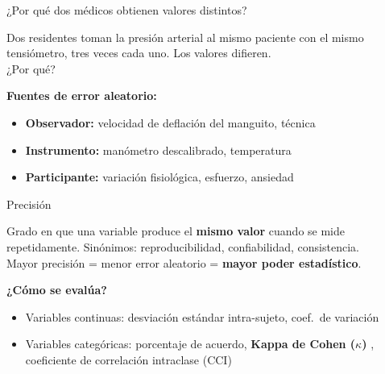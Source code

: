 \documentclass[aspectratio=169, 12pt, xcolor=table]{beamer}
\begin{document}
\begin{frame}{¿Por qué dos médicos obtienen valores distintos?}
  \begin{caso}
    Dos residentes toman la presión arterial al mismo paciente con el
    mismo tensiómetro, tres veces cada uno. Los valores difieren.\\[4pt]
    ¿Por qué?
  \end{caso}

  \vspace{8pt}
  \textbf{Fuentes de \textcolor{accent}{error aleatorio}:}
  \begin{itemize}
    \item \textbf{Observador:} velocidad de deflación del manguito, técnica
    \item \textbf{Instrumento:} manómetro descalibrado, temperatura
    \item \textbf{Participante:} variación fisiológica, esfuerzo, ansiedad
  \end{itemize}
\end{frame}

\begin{frame}{Precisión}
  \begin{definicion}[Precisión]
    Grado en que una variable produce el \textbf{mismo valor} cuando se
    mide repetidamente. Sinónimos: reproducibilidad, confiabilidad,
    consistencia.\\[4pt]
    Mayor precisión = menor error aleatorio = \textbf{mayor poder estadístico}.
  \end{definicion}

  \vspace{8pt}
  \textbf{¿Cómo se evalúa?}
  \begin{itemize}
    \item Variables continuas: desviación estándar intra-sujeto, coef.\ de variación
    \item Variables categóricas: porcentaje de acuerdo, \textbf{Kappa de Cohen ($\kappa$)}
          \cite{Cohen1960-kk}, coeficiente de correlación intraclase (CCI)
          \cite{Shrout1979-qv}
  \end{itemize}
\end{frame}
\end{document}
